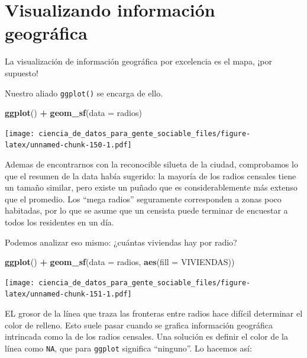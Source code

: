 \documentclass[spanish,]{book}
\newenvironment{Shaded}{\begin{snugshade}}{\end{snugshade}}
\newcommand{\DataTypeTok}[1]{\textcolor[rgb]{0.13,0.29,0.53}{#1}}
\newcommand{\KeywordTok}[1]{\textcolor[rgb]{0.13,0.29,0.53}{\textbf{#1}}}
\newcommand{\NormalTok}[1]{#1}
\newcommand{\OperatorTok}[1]{\textcolor[rgb]{0.81,0.36,0.00}{\textbf{#1}}}
\newcommand{\StringTok}[1]{\textcolor[rgb]{0.31,0.60,0.02}{#1}}
\begin{document}
\hypertarget{visualizando-informaciuxf3n-geogruxe1fica}{%
\section{Visualizando información geográfica}\label{visualizando-informaciuxf3n-geogruxe1fica}}

La visualización de información geográfica por excelencia es el mapa, ¡por supuesto!

Nuestro aliado \texttt{ggplot()} se encarga de ello.

\begin{Shaded}
\begin{Highlighting}[]
\KeywordTok{ggplot}\NormalTok{() }\OperatorTok{+}\StringTok{ }\KeywordTok{geom_sf}\NormalTok{(}\DataTypeTok{data =}\NormalTok{ radios)}
\end{Highlighting}
\end{Shaded}

\texttt{[image: ciencia\_de\_datos\_para\_gente\_sociable\_files/figure-latex/unnamed-chunk-150-1.pdf]}

Ademas de encontrarnos con la reconocible silueta de la ciudad, comprobamos lo que el resumen de la data había sugerido: la mayoría de los radios censales tiene un tamaño similar, pero existe un puñado que es considerablemente más extenso que el promedio. Los ``mega radios'' seguramente corresponden a zonas poco habitadas, por lo que se asume que un censista puede terminar de encuestar a todos los residentes en un día.

Podemos analizar eso mismo: ¿cuántas viviendas hay por radio?

\begin{Shaded}
\begin{Highlighting}[]
\KeywordTok{ggplot}\NormalTok{() }\OperatorTok{+}\StringTok{ }\KeywordTok{geom_sf}\NormalTok{(}\DataTypeTok{data =}\NormalTok{ radios, }\KeywordTok{aes}\NormalTok{(}\DataTypeTok{fill =}\NormalTok{ VIVIENDAS)) }
\end{Highlighting}
\end{Shaded}

\texttt{[image: ciencia\_de\_datos\_para\_gente\_sociable\_files/figure-latex/unnamed-chunk-151-1.pdf]}

EL grosor de la línea que traza las fronteras entre radios hace difícil determinar el color de relleno. Esto suele pasar cuando se grafica información geográfica intrincada como la de los radios censales. Una solución es definir el color de la línea como \texttt{NA}, que para \texttt{ggplot} significa ``ninguno''. Lo hacemos así:
\end{document}
